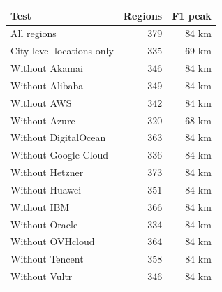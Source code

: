 \begin{tabular}{lrr}
\toprule
Test & Regions & F1 peak \\
\midrule
All regions & 379 & 84 km \\
City-level locations only & 335 & 69 km \\
Without Akamai & 346 & 84 km \\
Without Alibaba & 349 & 84 km \\
Without AWS & 342 & 84 km \\
Without Azure & 320 & 68 km \\
Without DigitalOcean & 363 & 84 km \\
Without Google Cloud & 336 & 84 km \\
Without Hetzner & 373 & 84 km \\
Without Huawei & 351 & 84 km \\
Without IBM & 366 & 84 km \\
Without Oracle & 334 & 84 km \\
Without OVHcloud & 364 & 84 km \\
Without Tencent & 358 & 84 km \\
Without Vultr & 346 & 84 km \\
\bottomrule
\end{tabular}
